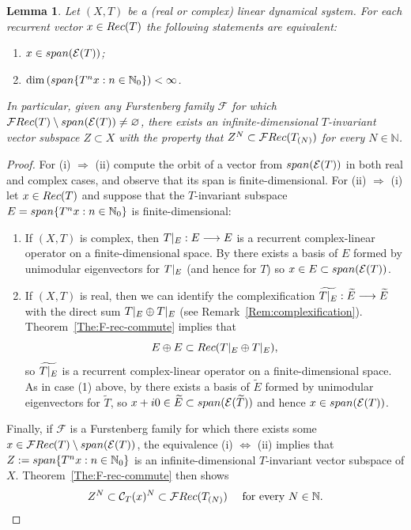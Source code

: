 \documentclass[openright,11pt]{article}
\theoremstyle{plain}
\newtheorem{lemma}[theorem]{Lemma}
\theoremstyle{definition}
\newcommand{\NN}{\mathbb{N}}
\newcommand{\Ec}{\mathcal{E}}
\newcommand{\Fc}{\mathcal{F}}
\newcommand{\Rec}{\textup{Rec}}
\newcommand{\Com}{\mathcal{C}}
\newcommand{\lspan}{\textup{span}}
\newcommand{\res}{\arrowvert}
\newcommand{\til}{\widetilde} %
\begin{document}
\begin{lemma}\label{Lem:finite.dimension}
	Let $(X,T)$ be a (real or complex) linear dynamical system. For each recurrent vector $x \in \Rec(T)$ the following statements are equivalent:
	\begin{enumerate}[{\em(i)}]
		\item $x \in \lspan(\Ec(T))$;
		
		\item $\dim \left( \lspan\{T^nx : n \in \NN_0\} \right) < \infty$.
	\end{enumerate}
	In particular, given any Furstenberg family $\Fc$ for which $\Fc\Rec(T)\setminus\lspan(\Ec(T))\neq\varnothing$, there exists an infinite-dimensional $T$-invariant vector subspace $Z \subset X$ with the property that $Z^N \subset \Fc\Rec(T_{(N)})$ for every $N \in \NN$.
\end{lemma}
\begin{proof}
	For (i) $\Rightarrow$ (ii) compute the orbit of a vector from $\lspan(\Ec(T))$ in both real and complex cases, and observe that its span is finite-dimensional. For (ii) $\Rightarrow$ (i) let $x \in \Rec(T)$ and suppose that the $T$-invariant subspace $E=\lspan\{ T^nx : n \in \NN_0 \}$ is finite-dimensional:
	\begin{enumerate}[(1)]
		\item If $(X,T)$ is complex, then $T\res_E:E\longrightarrow E$ is a recurrent complex-linear operator on a finite-dimensional space. By \cite[Theorem 4.1]{CoMaPa2014} there exists a basis of $E$ formed by unimodular eigenvectors for $T\res_E$ (and hence for $T$) so $x \in E \subset \lspan(\Ec(T))$.
		
		\item If $(X,T)$ is real, then we can identify the complexification $\til{T\res_E}:\til{E}\longrightarrow\til{E}$ with the direct sum $T\res_E\oplus T\res_E$ (see Remark~\ref{Rem:complexification}). Theorem~\ref{The:F-rec-commute} implies that
		\[
		E\oplus E \subset \Rec(T\res_E\oplus T\res_E),
		\]
		so $\til{T\res_E}$ is a recurrent complex-linear operator on a finite-dimensional space. As in case (1) above, by \cite[Theorem 4.1]{CoMaPa2014} there exists a basis of $\til{E}$ formed by unimodular eigenvectors for $\til{T}$, so $x+i0 \in \til{E} \subset \lspan(\Ec(\til{T}))$ and hence $x \in \lspan(\Ec(T))$.
	\end{enumerate}
	Finally, if $\Fc$ is a Furstenberg family for which there exists some $x\in\Fc\Rec(T)\setminus\lspan(\Ec(T))$, the equivalence (i) $\Leftrightarrow$ (ii) implies that $Z:=\lspan\{ T^nx : n \in \NN_0 \}$ is an infinite-dimensional $T$-invariant vector subspace of $X$. Theorem~\ref{The:F-rec-commute} then shows
	\[
	Z^N \subset \Com_T(x)^N \subset \Fc\Rec(T_{(N)}) \quad \text{ for every } N \in \NN.\qedhere
	\] 
\end{proof}
\end{document}
